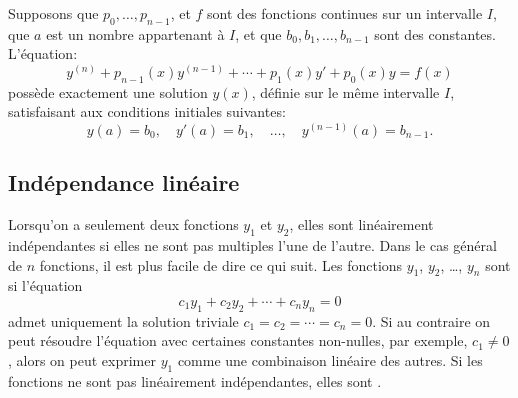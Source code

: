 \begin{theorem}
Supposons que $p_0,\ldots, p_{n-1}$, et $f$ sont des fonctions continues sur un intervalle $I$,
que $a$ est un nombre appartenant à $I$,
et que $b_0, b_1, \ldots, b_{n-1}$ sont des constantes.
L'équation: 
\begin{equation*} %
y^{(n)} + p_{n-1}(x)y^{(n-1)} + \cdots + p_1(x) y' + p_0(x) y = f(x) 
\end{equation*}
possède exactement une solution $y(x)$, définie sur le même intervalle $I$, 
satisfaisant aux conditions initiales suivantes: 
\begin{equation*}
y(a) = b_0, \quad y'(a) = b_1, \quad \ldots, \quad y^{(n-1)}(a) = b_{n-1} .
\end{equation*}
\end{theorem}

\subsection{Indépendance linéaire}

Lorsqu'on a seulement deux fonctions $y_1$ et $y_2$, elles sont linéairement indépendantes si elles ne sont pas multiples l'une de l'autre. Dans le cas général de $n$ fonctions, il est plus facile de dire ce qui suit. Les fonctions  
$y_1$, $y_2$, \ldots, $y_n$ sont \emph{} si l'équation
\begin{equation*}
c_1 y_1 + c_2 y_2 + \cdots + c_n y_n = 0 
\end{equation*}
admet uniquement la solution triviale $c_1 = c_2 = \cdots = c_n = 0$.  Si au contraire on peut résoudre l'équation avec certaines constantes non-nulles, par exemple,  $c_1 \not= 0$, alors on peut exprimer $y_1$ comme une combinaison linéaire des autres. Si les fonctions ne sont pas linéairement indépendantes, elles sont  \emph{}.

